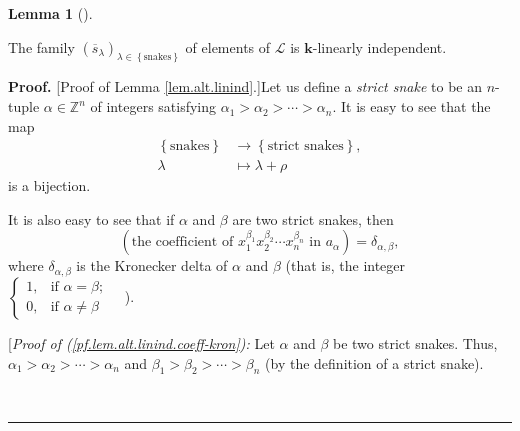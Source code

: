 \documentclass[numbers=enddot,12pt,final,onecolumn,notitlepage]{scrartcl}%
\theoremstyle{definition}
\newtheorem{lem}[theo]{Lemma}
\newenvironment{lemma}[1][]
{\begin{lem}[#1]\begin{leftbar}}
{\end{leftbar}\end{lem}}
\newenvironment{proof}[1][Proof]{\noindent\textbf{#1.} }{\ \rule{0.5em}{0.5em}}
\newenvironment{verlong}{}{}
\begin{document}
\begin{lemma}
\label{lem.alt.linind}The family $\left(  \overline{s}_{\lambda}\right)
_{\lambda\in\left\{  \text{snakes}\right\}  }$ of elements of $\mathcal{L}$ is
$\mathbf{k}$-linearly independent.
\end{lemma}

\begin{proof}
[Proof of Lemma \ref{lem.alt.linind}.]Let us define a \emph{strict snake} to
be an $n$-tuple $\alpha\in\mathbb{Z}^{n}$ of integers satisfying $\alpha
_{1}>\alpha_{2}>\cdots>\alpha_{n}$. It is easy to see that the map
\begin{align}
\left\{  \text{snakes}\right\}   &  \rightarrow\left\{  \text{strict
snakes}\right\}  ,\nonumber\\
\lambda &  \mapsto\lambda+\rho\label{pf.lem.alt.linind.strict-bij}%
\end{align}
is a bijection.

It is also easy to see that if $\alpha$ and $\beta$ are two strict snakes,
then%
\begin{equation}
\left(  \text{the coefficient of }x_{1}^{\beta_{1}}x_{2}^{\beta_{2}}\cdots
x_{n}^{\beta_{n}}\text{ in }a_{\alpha}\right)  =\delta_{\alpha,\beta},
\label{pf.lem.alt.linind.coeff-kron}%
\end{equation}
where $\delta_{\alpha,\beta}$ is the Kronecker delta of $\alpha$ and $\beta$
(that is, the integer $%
\begin{cases}
1, & \text{if }\alpha=\beta;\\
0, & \text{if }\alpha\neq\beta
\end{cases}
$\ \ ).

\begin{verlong}
[\textit{Proof of (\ref{pf.lem.alt.linind.coeff-kron}):} Let $\alpha$ and
$\beta$ be two strict snakes. Thus, $\alpha_{1}>\alpha_{2}>\cdots>\alpha_{n}$
and $\beta_{1}>\beta_{2}>\cdots>\beta_{n}$ (by the definition of a strict snake).


\end{verlong}
\end{proof}
\end{document}

